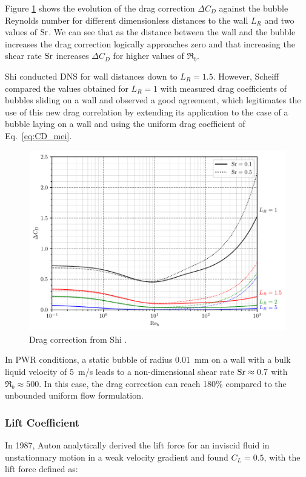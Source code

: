 Figure \ref{fig:CD_shi} shows the evolution of the drag correction $\Delta C_{D}$ against the bubble Reynolds number for different dimensionless distances to the wall $L_{R}$ and two values of $\mathrm{Sr}$.  We can see that as the distance between the wall and the bubble increases the drag correction logically approaches zero and that increasing the shear rate $\mathrm{Sr}$ increases $\Delta C_{D}$ for higher values of $\Re_{b}$.

\npar

Shi \etal \cite{shi_drag_2021} conducted DNS for wall distances down to $L_{R}=1.5$. However, Scheiff \etal \cite{scheiff_experimental_2021} compared the values obtained for $L_{R}=1$  with measured drag coefficients of bubbles sliding on a wall and observed a good agreement, which legitimates the use of this new drag correlation by extending its application to the case of a bubble laying on a wall and using the uniform drag coefficient of Eq.~\ref{eq:CD_mei}.


\begin{figure}[h!]
\centering
\includegraphics[width=0.6\linewidth]{img/bub_dyn/forces/corr_drag.pdf}
\caption{Drag correction from Shi \etal \cite{shi_drag_2021}.}
\label{fig:CD_shi}
\end{figure}


\begin{remark*}{}
In PWR conditions, a static bubble of radius $0.01$\ mm on a wall with a bulk liquid velocity of $5$\ m/s leads to a non-dimensional shear rate $\mathrm{Sr} \approx 0.7$ with $\Re_{b} \approx 500$. In this case, the drag correction can reach 180\% compared to the unbounded uniform flow formulation.
\end{remark*}


\subsubsection{Lift Coefficient}


In 1987, Auton \etal \cite{auton_lift_1987} analytically derived the lift force for an inviscid fluid in unstationnary motion in a weak velocity gradient and found $C_{L}=0.5$, with the lift force defined as:

